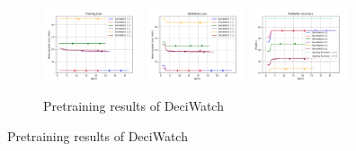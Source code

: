 \documentclass{beamer}
\begin{document}
\begin{frame}
\begin{figure}[htbp]
        \begin{subfigure}[b]{\textwidth}
            \centering
            \includegraphics[width=0.32\textwidth]{./entities/pretrained_new/deciwatch/train_losses.png}
            \includegraphics[width=0.32\textwidth]{./entities/pretrained_new/deciwatch/val_losses.png}
            \includegraphics[width=0.32\textwidth]{./entities/pretrained_new/deciwatch/val_accs.png}
            \caption{Pretraining results of DeciWatch}
        \end{subfigure}
        \hfill
    \end{figure}
\end{frame}
\end{document}
